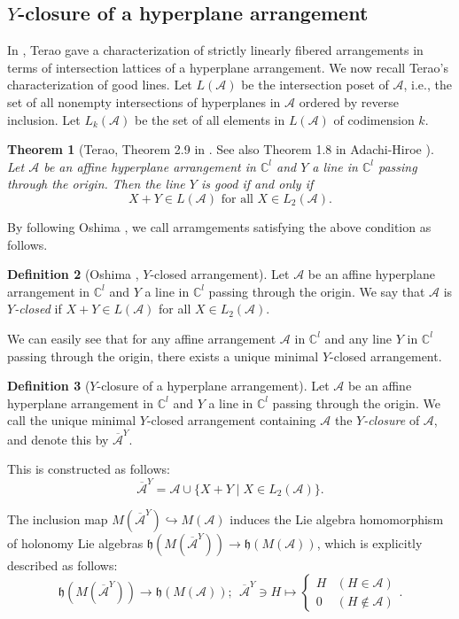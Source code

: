 \documentclass[a4paper,12pt]{article}
\newcommand{\C}{\mathbb{C}}
\newtheorem{thm}{Theorem}[section]
\theoremstyle{definition}
\newtheorem{df}[thm]{Definition}
\theoremstyle{remark}
\begin{document}
\subsection{$Y$-closure of a hyperplane arrangement}\label{sec:Yclosure}
In \cite{Tera1}, Terao gave a characterization of strictly linearly fibered arrangements in terms of intersection lattices of a hyperplane arrangement.
We now recall Terao's characterization of good lines.
Let $L(\mathcal{A})$ be the intersection poset of $\mathcal{A}$, i.e., the set of all nonempty intersections of hyperplanes in $\mathcal{A}$ ordered by reverse inclusion.
Let $L_{k}(\mathcal{A})$ be the set of all elements in $L(\mathcal{A})$ of codimension $k$.
\begin{thm}[Terao, Theorem 2.9 in \cite{Tera1}. See also  Theorem 1.8 in Adachi-Hiroe \cite{AdaHir}]\label{thm:goodline}
Let $\mathcal{A}$ be an affine hyperplane arrangement in $\C^{l}$ and $Y$ a line in $\C^{l}$ passing through the origin.
Then the line $Y$ is good if and only if 
\[
	X+Y\in L(\mathcal{A})\text{ for all }X\in L_{2}(\mathcal{A}).
\]
\end{thm}
By following Oshima \cite{Oshi3}, we call arramgements satisfying the above condition as follows.
\begin{df}[Oshima \cite{Oshi3}, $Y$-closed arrangement]
	Let $\mathcal{A}$ be an affine hyperplane arrangement in $\C^{l}$ and $Y$ a line in $\C^{l}$ passing through the origin.
	We say that $\mathcal{A}$ is \emph{$Y$-closed} if $X+Y\in L(\mathcal{A})$ for all $X\in L_{2}(\mathcal{A})$.
\end{df}

We can easily see that for any affine arrangement $\mathcal{A}$ in $\C^{l}$ and any line $Y$ in $\C^{l}$ passing through the origin, there exists a unique minimal $Y$-closed arrangement.
\begin{df}[$Y$-closure of a hyperplane arrangement]
	Let $\mathcal{A}$ be an affine hyperplane arrangement in $\C^{l}$ and $Y$ a line in $\C^{l}$ passing through the origin.
	We call the unique minimal $Y$-closed arrangement containing $\mathcal{A}$ the \emph{$Y$-closure} of $\mathcal{A}$, and denote this by $\overline{\mathcal{A}}^{Y}$.
\end{df}
This is constructed as follows:
\begin{equation*}
	\overline{\mathcal{A}}^{Y}=\mathcal{A}\cup \{X+Y\mid X\in L_{2}(\mathcal{A})\}. 
\end{equation*}

The inclusion map $M(\overline{\mathcal{A}}^{Y})\hookrightarrow M(\mathcal{A})$ induces 
the Lie algebra homomorphism of holonomy Lie algebras $\mathfrak{h}(M(\overline{\mathcal{A}}^{Y}))\to \mathfrak{h}(M(\mathcal{A}))$,
which is explicitly described as follows:
\[
	\mathfrak{h}(M(\overline{\mathcal{A}}^{Y}))\to \mathfrak{h}(M(\mathcal{A}));\ \
	\overline{\mathcal{A}}^{Y}\ni H\mapsto \begin{cases}
	H & (H\in \mathcal{A})\\
	0 & (H\notin \mathcal{A})
\end{cases}.
\]
\end{document}
